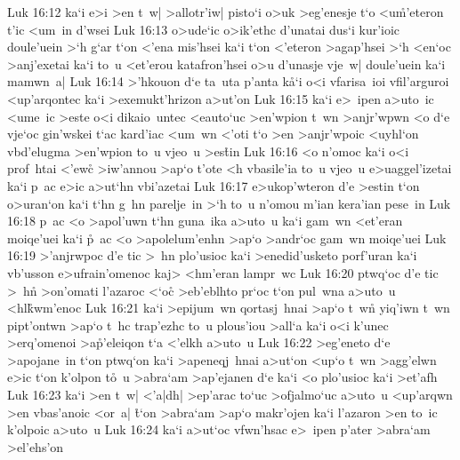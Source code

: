 \vs Luk 16:12
ka`i
e>i
>en
t~w|
>allotr'iw|
pisto`i
o>uk
>eg'enesje
t`o
<u\r{m}'eteron
t'ic
<um~in
d'wsei\bibvsend
\vs Luk 16:13
o>ude`ic
o>ik'ethc
d'unatai
dus`i
kur'ioic
doule'uein
>`h
g`ar
t`on
<'ena
mis'hsei
ka`i
t`on
<'eteron
>agap'hsei
>`h
<en`oc
>anj'exetai
ka`i
to~u
<et'erou
katafron'hsei
o>u
d'unasje
vje~w|
doule'uein
ka`i
mamwn~a|\bibvsend
\vs Luk 16:14
>'hkouon
d`e
ta~uta
p'anta
k\r{a}`i
o<i
vfarisa~ioi
vfil'arguroi
<up'arqontec
ka`i
>exemukt'hrizon
a>ut'on\bibvsend
\vs Luk 16:15
ka`i
e>~ipen
a>uto~ic
<ume~ic
>este
o<i
dikaio~untec
<eauto`uc
>en'wpion
t~wn
>anjr'wpwn
<o
d`e
vje`oc
gin'wskei
t`ac
kard'iac
<um~wn
<'oti
t`o
>en
>anjr'wpoic
<uyhl`on
vbd'elugma
>en'wpion
to~u
vjeo~u
>es\r{t}in\bibvsend
{}
\vs Luk 16:16
<o
n'omoc
ka`i
o<i
prof~htai
<'ew\r{c}
>iw'annou
>ap`o
t'ote
<h
vbasile'ia
to~u
vjeo~u
e>uaggel'izetai
ka`i
p~ac
e>ic
a>ut`hn
vbi'azetai\bibvsend
\vs Luk 16:17
e>ukop'wteron
d'e
>estin
t`on
o>uran`on
ka`i
t`hn
g~hn
parelje~in
>`h
to~u
n'omou
m'ian
kera'ian
pese~in\bibvsend
\vs Luk 16:18
p~ac
<o
>apol'uwn
t`hn
guna~ika
a>uto~u
ka`i
gam~wn
<et'eran
moiqe'uei
ka`i
\r{p}~ac
<o
>apolelum'enhn
>ap`o
>andr`oc
gam~wn
moiqe'uei\bibvsend
\vs Luk 16:19
>'anjrwpoc
d'e
tic
>~hn
plo'usioc
ka`i
>enedid'usketo
porf'uran
ka`i
vb'usson
e>ufrain'omenoc
kaj>
<hm'eran
lampr~wc\bibvsend
\vs Luk 16:20
ptwq`oc
d'e
tic
>~h\r{n}
>on'omati
l'azaroc
<`o\r{c}
>eb'eblhto
pr`oc
t`on
pul~wna
a>uto~u
<hl\r{k}wm'enoc\bibvsend
{}
\vs Luk 16:21
ka`i
>epijum~wn
qortasj~hnai
>ap`o
t~wn\r{}
yiq'iwn
t~wn
pipt'ontwn
>ap`o
t~hc
trap'ezhc
to~u
plous'iou
>all`a
ka`i
o<i
k'unec
>erq'omenoi
>a\r{p}'eleiqon
t`a
<'elkh
a>uto~u\bibvsend
\vs Luk 16:22
>eg'eneto
d`e
>apojane~in
t`on
ptwq`on
ka`i
>apeneqj~hnai
a>ut`on
<up`o
t~wn
>agg'elwn
e>ic
t`on
k'olpon
t\r{o}~u
>abra`am
>ap'ejanen
d`e
ka`i
<o
plo'usioc
ka`i
>et'afh\bibvsend
\vs Luk 16:23
ka`i
>en
t~w|
<'a|dh|
>ep'arac
to`uc
>ofjalmo`uc
a>uto~u
<up'arqwn
>en
vbas'anoic
<or~a|
\r{t}`on
>abra`am
>ap`o
makr'ojen
ka`i
l'azaron
>en
to~ic
k'olpoic
a>uto~u\bibvsend
\vs Luk 16:24
ka`i
a>ut`oc
vfwn'hsac
e>~ipen
p'ater
>abra`am
>el'ehs'on
